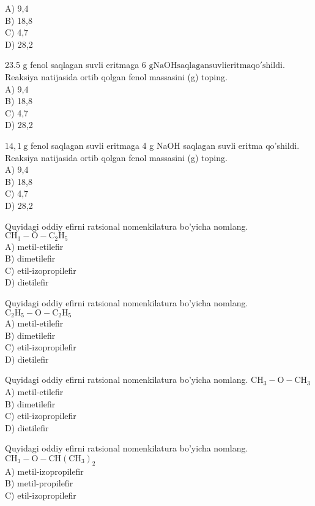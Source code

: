 A) 9,4\\
B) 18,8\\
C) 4,7\\
D) 28,2
  \item 23.5 g fenol saqlagan suvli eritmaga 6 $\mathrm{g} \mathrm{NaOH} \mathrm{saqlagan} \mathrm{suvli} \mathrm{eritma} \mathrm{qo'shildi}$. Reaksiya natijasida ortib qolgan fenol massasini (g) toping.\\
A) 9,4\\
B) 18,8\\
C) 4,7\\
D) 28,2
  \item $14,1 \mathrm{~g}$ fenol saqlagan suvli eritmaga 4 g NaOH saqlagan suvli eritma qo'shildi. Reaksiya natijasida ortib qolgan fenol massasini (g) toping.\\
A) 9,4\\
B) 18,8\\
C) 4,7\\
D) 28,2
  \item Quyidagi oddiy efirni ratsional nomenkilatura bo'yicha nomlang. $\mathrm{CH}_{3}-\mathrm{O}-\mathrm{C}_{2} \mathrm{H}_{5}$\\
A) metil-etilefir\\
B) dimetilefir\\
C) etil-izopropilefir\\
D) dietilefir
  \item Quyidagi oddiy efirni ratsional nomenkilatura bo'yicha nomlang. $\mathrm{C}_{2} \mathrm{H}_{5}-\mathrm{O}-\mathrm{C}_{2} \mathrm{H}_{5}$\\
A) metil-etilefir\\
B) dimetilefir\\
C) etil-izopropilefir\\
D) dietilefir
  \item Quyidagi oddiy efirni ratsional nomenkilatura bo'yicha nomlang. $\mathrm{CH}_{3}-\mathrm{O}-\mathrm{CH}_{3}$\\
A) metil-etilefir\\
B) dimetilefir\\
C) etil-izopropilefir\\
D) dietilefir
  \item Quyidagi oddiy efirni ratsional nomenkilatura bo'yicha nomlang. $\mathrm{CH}_{3}-\mathrm{O}-\mathrm{CH}\left(\mathrm{CH}_{3}\right)_{2}$\\
A) metil-izopropilefir\\
B) metil-propilefir\\
C) etil-izopropilefir\\
